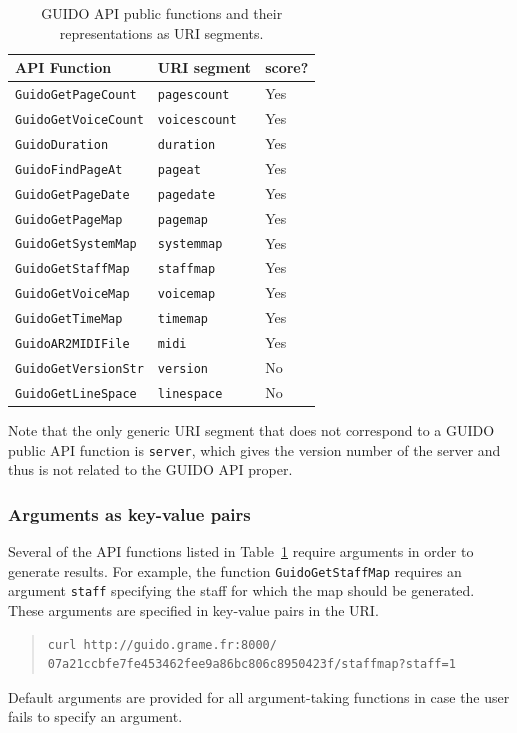 \documentclass{article}
\newcommand{\guidosize}{6pt}
\begin{document}
\begin{table}
\begin{tabular}{|l|l|l|}\hline
API Function & URI segment & score? \\\hline
\verb=GuidoGetPageCount= & \verb=pagescount= & Yes \\\hline
\verb=GuidoGetVoiceCount= & \verb=voicescount= & Yes \\\hline
\verb=GuidoDuration= & \verb=duration= & Yes \\\hline
\verb=GuidoFindPageAt= & \verb=pageat= & Yes \\\hline
\verb=GuidoGetPageDate= & \verb=pagedate= & Yes \\\hline
\verb=GuidoGetPageMap= & \verb=pagemap= & Yes \\\hline
\verb=GuidoGetSystemMap= & \verb=systemmap= & Yes \\\hline
\verb=GuidoGetStaffMap= & \verb=staffmap= & Yes \\\hline
\verb=GuidoGetVoiceMap= & \verb=voicemap= & Yes \\\hline
\verb=GuidoGetTimeMap= & \verb=timemap= & Yes \\\hline
\verb=GuidoAR2MIDIFile= & \verb=midi= & Yes \\\hline
\verb=GuidoGetVersionStr= & \verb=version= & No \\\hline
\verb=GuidoGetLineSpace= & \verb=linespace= & No \\\hline
\end{tabular}
\cprotect\caption{\label{table:table1} GUIDO API public functions and their representations as URI segments.}
\end{table}
Note that the only generic URI segment that does not correspond to a GUIDO public API function is \verb=server=, which gives the version number of the server and thus is not related to the GUIDO API proper.
\subsubsection{Arguments as key-value pairs}
Several of the API functions listed in Table~\ref{table:table1} require arguments in order to generate results.  For example, the function \verb=GuidoGetStaffMap= requires an argument \verb=staff= specifying the staff for which the map should be generated.  These arguments are specified in key-value pairs in the URI.
\begin{quote}
\begingroup
\fontsize{\guidosize}{12pt}\selectfont
\begin{verbatim}
curl http://guido.grame.fr:8000/
07a21ccbfe7fe453462fee9a86bc806c8950423f/staffmap?staff=1
\end{verbatim}
\endgroup
\end{quote}
Default arguments are provided for all argument-taking functions in case the user fails to specify an argument.
\end{document}
